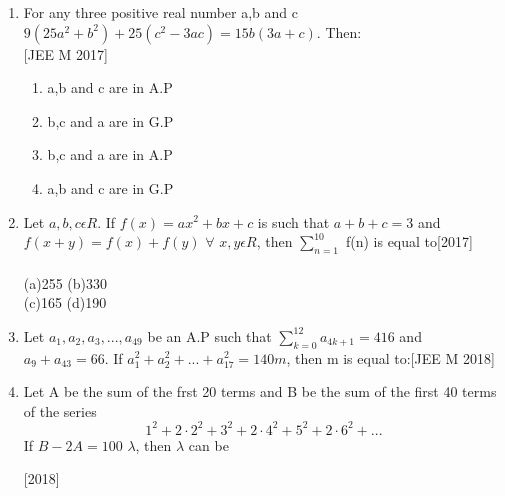 \documentclass[journal,12pt,twocolumn]{IEEEtran}
\theoremstyle{remark}
\begin{document}
\begin{enumerate}
 \item{For any three positive real number a,b and c $9(25a^2+b^2)+ 25(c^2-3ac) = 15b(3a+c)$. Then:\\ \null \hfill{[JEE M 2017]}\begin{multicols}{2}
	 \begin{enumerate}\itemsep.5em
  \item{a,b and c are in A.P}
  \item{b,c and a are in G.P}
  \columnbreak
  \item{b,c and a are in A.P}
  \item{a,b and c are in G.P}
  \end{enumerate}
  \end{multicols}}
  \item{Let $a,b,c\epsilon R$. If $f(x)=ax^2+bx+c$ is such that $a+b+c=3$ and $f(x+y)=f(x)+f(y)$ $\forall$ $x,y \epsilon R$, then $\sum _{n=1}^{10}$  f(n)  is  equal  to\hfill{[2017]}\\\\(a)255 \hspace{2cm}(b)330\\(c)165 \hspace{2cm}(d)190} 
  \item{Let $a_{1},a_{2},a_{3},...,a_{49}$ be an A.P such that $\sum_{k=0}^{12} a_{4k+1}=416$ and $a_{9}+a_{43}=66$. If $a_{1}^2+ a_{2}^{2}+...+a_{17}^{2}=140m$, then m is equal to:\hfill{[JEE M 2018]}\begin{enumerate}
  \end{enumerate}}
  \item{Let A be the sum of the frst 20 terms and B be the sum of the first 40 terms of the series \[1^{2} +2\cdot2^{2}+3^{2}+2\cdot4^{2}+5^{2}+2\cdot6^{2}+...\] If $B-2A=100$ $\lambda$, then $\lambda$ can be\hfill{[2018]\begin{enumerate}
  \end{enumerate}}
}
\end{enumerate}
\end{document}
